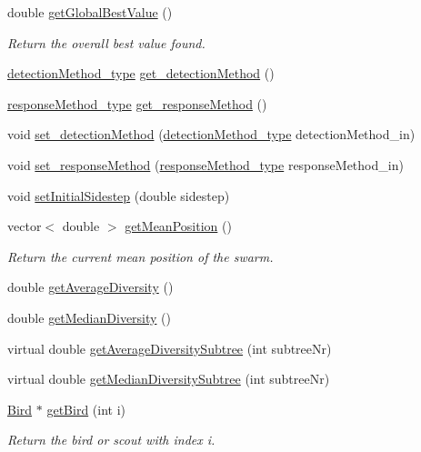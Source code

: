 \begin{CompactItemize}
double \hyperlink{classSwarm_29b92fc70b57a38a6db7a03d6f9df4ea}{getGlobalBestValue} ()
\begin{CompactList}\small\item\em Return the overall best value found. \item\end{CompactList}\item 
\hyperlink{pso_8h_ea087f59f65df7bbf4798bccd8a02416}{detectionMethod\_\-type} \hyperlink{classSwarm_1f6eec525de52241c5b1272a07361e20}{get\_\-detectionMethod} ()
\item 
\hyperlink{pso_8h_0c2464ff08436288377b981af15bbb6d}{responseMethod\_\-type} \hyperlink{classSwarm_eee2a8aaef1290bf85df295881aab486}{get\_\-responseMethod} ()
\item 
void \hyperlink{classSwarm_b90bce798796c7b9cee3322e7531df34}{set\_\-detectionMethod} (\hyperlink{pso_8h_ea087f59f65df7bbf4798bccd8a02416}{detectionMethod\_\-type} detectionMethod\_\-in)
\item 
void \hyperlink{classSwarm_896cd984569235391fc53353d87a9337}{set\_\-responseMethod} (\hyperlink{pso_8h_0c2464ff08436288377b981af15bbb6d}{responseMethod\_\-type} responseMethod\_\-in)
\item 
void \hyperlink{classSwarm_ba26dbec7b48abc3e5d964ac3b512ed0}{setInitialSidestep} (double sidestep)
\item 
vector$<$ double $>$ \hyperlink{classSwarm_71be1e7ff66391d2f1e12f742ed9794d}{getMeanPosition} ()
\begin{CompactList}\small\item\em Return the current mean position of the swarm. \item\end{CompactList}\item 
double \hyperlink{classSwarm_3f51b2c5d7a170f17b7290857c2ba3cb}{getAverageDiversity} ()
\item 
double \hyperlink{classSwarm_40ac578ec7abab1bfd2a0d4fc4051811}{getMedianDiversity} ()
\item 
virtual double \hyperlink{classSwarm_71dc0d0753bfea580e841234b9c63ebc}{getAverageDiversitySubtree} (int subtreeNr)
\item 
virtual double \hyperlink{classSwarm_4f31a2aeda867e79eab25b1a108f1c6f}{getMedianDiversitySubtree} (int subtreeNr)
\item 
\hyperlink{classBird}{Bird} $\ast$ \hyperlink{classSwarm_b762d426b74600501d4c80431df380a9}{getBird} (int i)
\begin{CompactList}\small\item\em Return the bird or scout with index i. \item\end{CompactList}\item 

\end{CompactItemize}
